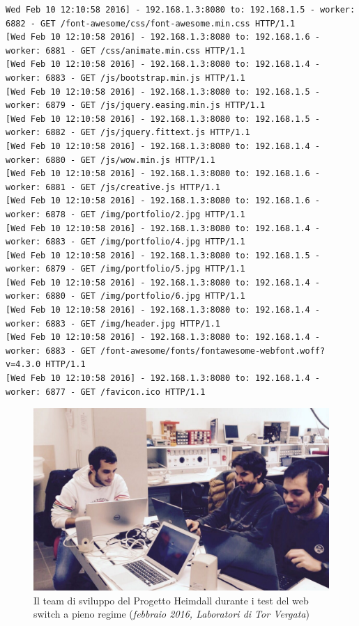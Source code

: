 \documentclass[italian]{tktltiki2}
\begin{document}
\begin{lstlisting}[basicstyle=\fontsize{4}{7}\selectfont\ttfamily]
Wed Feb 10 12:10:58 2016] - 192.168.1.3:8080 to: 192.168.1.5 - worker: 6882 - GET /font-awesome/css/font-awesome.min.css HTTP/1.1
[Wed Feb 10 12:10:58 2016] - 192.168.1.3:8080 to: 192.168.1.6 - worker: 6881 - GET /css/animate.min.css HTTP/1.1
[Wed Feb 10 12:10:58 2016] - 192.168.1.3:8080 to: 192.168.1.4 - worker: 6883 - GET /js/bootstrap.min.js HTTP/1.1
[Wed Feb 10 12:10:58 2016] - 192.168.1.3:8080 to: 192.168.1.5 - worker: 6879 - GET /js/jquery.easing.min.js HTTP/1.1
[Wed Feb 10 12:10:58 2016] - 192.168.1.3:8080 to: 192.168.1.5 - worker: 6882 - GET /js/jquery.fittext.js HTTP/1.1
[Wed Feb 10 12:10:58 2016] - 192.168.1.3:8080 to: 192.168.1.4 - worker: 6880 - GET /js/wow.min.js HTTP/1.1
[Wed Feb 10 12:10:58 2016] - 192.168.1.3:8080 to: 192.168.1.6 - worker: 6881 - GET /js/creative.js HTTP/1.1
[Wed Feb 10 12:10:58 2016] - 192.168.1.3:8080 to: 192.168.1.6 - worker: 6878 - GET /img/portfolio/2.jpg HTTP/1.1
[Wed Feb 10 12:10:58 2016] - 192.168.1.3:8080 to: 192.168.1.4 - worker: 6883 - GET /img/portfolio/4.jpg HTTP/1.1
[Wed Feb 10 12:10:58 2016] - 192.168.1.3:8080 to: 192.168.1.5 - worker: 6879 - GET /img/portfolio/5.jpg HTTP/1.1
[Wed Feb 10 12:10:58 2016] - 192.168.1.3:8080 to: 192.168.1.4 - worker: 6880 - GET /img/portfolio/6.jpg HTTP/1.1
[Wed Feb 10 12:10:58 2016] - 192.168.1.3:8080 to: 192.168.1.4 - worker: 6883 - GET /img/header.jpg HTTP/1.1
[Wed Feb 10 12:10:58 2016] - 192.168.1.3:8080 to: 192.168.1.4 - worker: 6883 - GET /font-awesome/fonts/fontawesome-webfont.woff?v=4.3.0 HTTP/1.1
[Wed Feb 10 12:10:58 2016] - 192.168.1.3:8080 to: 192.168.1.4 - worker: 6877 - GET /favicon.ico HTTP/1.1

\end{lstlisting}

\newpage
\begin{figure}[H]
\centering
\includegraphics[width=\textwidth]{images/team}
\caption{Il team di sviluppo del Progetto Heimdall durante i test del web switch a pieno regime (\emph{febbraio 2016, Laboratori di Tor Vergata})}
\end{figure}
\end{document}
